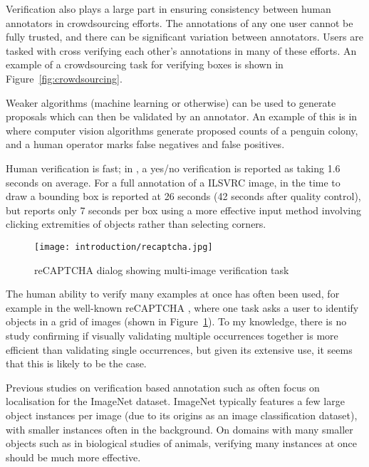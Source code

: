 Verification also plays a large part in ensuring consistency between human annotators in crowdsourcing efforts. The annotations of any one user cannot be fully trusted, and there can be significant variation between annotators. Users are tasked with cross verifying each other's annotations in many of these efforts. An example of a crowdsourcing task \cite{Su2012a} for verifying boxes is shown in Figure~\ref{fig:crowdsourcing}.

Weaker algorithms (machine learning or otherwise) can be used to generate proposals which can then be validated by an annotator. An example of this is in \cite{McNeill2011} where computer vision algorithms generate proposed counts of a penguin colony, and a human operator marks false negatives and false positives.

Human verification is fast; in \cite{Papadopoulos2016}, a yes/no verification is reported as taking 1.6 seconds on average. For a full annotation of a \gls{ILSVRC} image, in \cite{Su2012a} the time to draw a bounding box is reported at 26 seconds (42 seconds after quality control), but \cite{Papadopoulos2017} reports only 7 seconds per box using a more effective input method involving clicking extremities of objects rather than selecting corners. 

\begin{figure}[ht]
  \centering
  \texttt{[image: introduction/recaptcha.jpg]}
  \caption{reCAPTCHA dialog showing multi-image verification task}  
  \label{fig:captcha}
\end{figure}

The human ability to verify many examples at once has often been used, for example in the well-known reCAPTCHA \cite{von2008recaptcha}, where one task asks a user to identify objects in a grid of images (shown in Figure~\ref{fig:captcha}). To my knowledge, there is no study confirming if visually validating multiple occurrences together is more efficient than validating single occurrences, but given its extensive use, it seems that this is likely to be the case.

Previous studies on verification based annotation such as \cite{Papadopoulos2016} often focus on localisation for the ImageNet dataset. ImageNet typically features a few large object instances per image (due to its origins as an image classification dataset), with smaller instances often in the background. On domains with many smaller objects such as in biological studies of animals, verifying many instances at once should be much more effective. 


